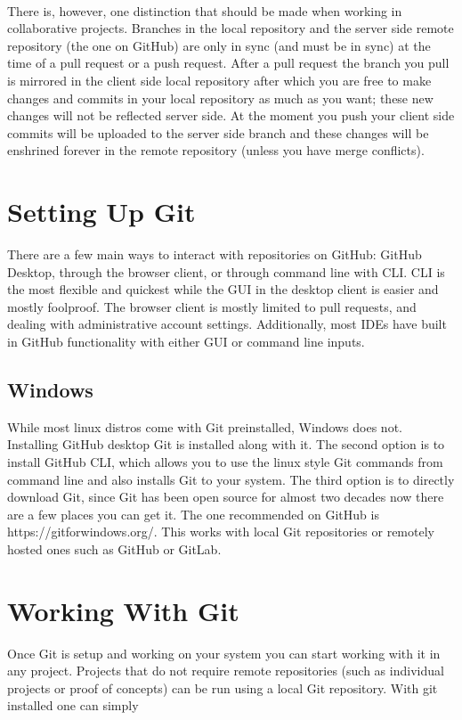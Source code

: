 \documentclass{article}
\begin{document}
\paragraph{}
There is, however, one distinction that should be made when working in collaborative projects. Branches in the local repository and the server side remote repository (the one on GitHub) are only in sync (and must be in sync) at the time of a pull request or a push request. After a pull request the branch you pull is mirrored in the client side local repository after which you are free to make changes and commits in your local repository as much as you want; these new changes will not be reflected server side. At the moment you push your client side commits will be uploaded to the server side branch and these changes will be enshrined forever in the remote repository (unless you have merge conflicts).
\section{Setting Up Git}
There are a few main ways to interact with repositories on GitHub: GitHub Desktop, through the browser client, or through command line with CLI. CLI is the most flexible and quickest while the GUI in the desktop client is easier and mostly foolproof. The browser client is mostly limited to pull requests, and dealing with administrative account settings. Additionally, most IDEs have built in GitHub functionality with either GUI or command line inputs. 
\subsection{Windows}
While most linux distros come with Git preinstalled, Windows does not. Installing GitHub desktop Git is installed along with it. The second option is to install GitHub CLI, which allows you to use the linux style Git commands from command line and also installs Git to your system. The third option is to directly download Git, since Git has been open source for almost two decades now there are a few places you can get it. The one recommended on GitHub is https://gitforwindows.org/. This works with local Git repositories or remotely hosted ones such as GitHub or GitLab.
\section{Working With Git}
Once Git is setup and working on your system you can start working with it in any project. Projects that do not require remote repositories (such as individual projects or proof of concepts) can be run using a local Git repository. With git installed one can simply 
\end{document}
